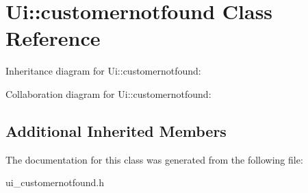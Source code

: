 \section{Ui\+:\+:customernotfound Class Reference}
\label{class_ui_1_1customernotfound}


Inheritance diagram for Ui\+:\+:customernotfound\+:


Collaboration diagram for Ui\+:\+:customernotfound\+:
\subsection*{Additional Inherited Members}


The documentation for this class was generated from the following file\+:\begin{DoxyCompactItemize}
\item 
ui\+\_\+customernotfound.\+h\end{DoxyCompactItemize}
